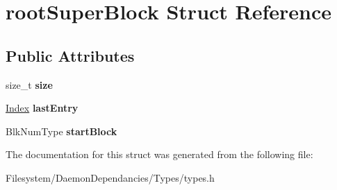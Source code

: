 \hypertarget{structrootSuperBlock}{}\section{root\+Super\+Block Struct Reference}
\label{structrootSuperBlock}
\subsection*{Public Attributes}
\begin{DoxyCompactItemize}
\item 
\mbox{\label{structrootSuperBlock_a346c6cd3ede82eb90190548d45c1789d}} 
size\+\_\+t {\bfseries size}
\item 
\mbox{\label{structrootSuperBlock_ac316fdcc2d2736d675980495d1732872}} 
\mbox{\hyperlink{structindex}{Index}} {\bfseries last\+Entry}
\item 
\mbox{\label{structrootSuperBlock_afb7d56b6d69b3f1555db0e3bce1d9612}} 
Blk\+Num\+Type {\bfseries start\+Block}
\end{DoxyCompactItemize}


The documentation for this struct was generated from the following file\+:\begin{DoxyCompactItemize}
\item 
Filesystem/\+Daemon\+Dependancies/\+Types/types.\+h\end{DoxyCompactItemize}
